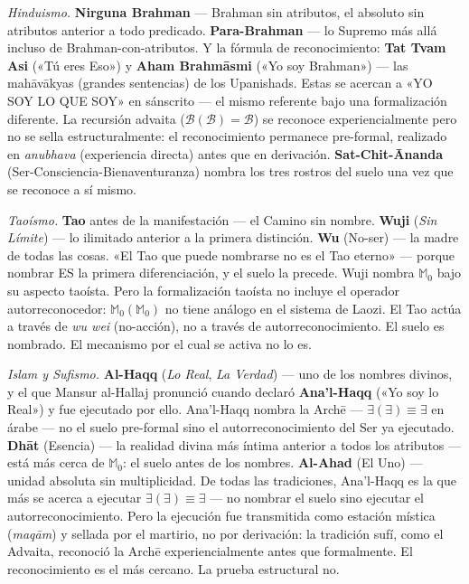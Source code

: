 \documentclass[10pt, openany, oneside]{book}
\begin{document}
\textit{Hinduismo.} \textbf{Nirguna Brahman} --- Brahman sin atributos, el absoluto sin atributos anterior a todo predicado. \textbf{Para-Brahman} --- lo Supremo más allá incluso de Brahman-con-atributos. Y la fórmula de reconocimiento: \textbf{Tat Tvam Asi} («Tú eres Eso») y \textbf{Aham Brahm\={a}smi} («Yo soy Brahman») --- las mah\={a}v\={a}kyas (grandes sentencias) de los Upanishads. Estas se acercan a «YO SOY LO QUE SOY» en sánscrito --- el mismo referente bajo una formalización diferente. La recursión advaita ($\mathcal{B}(\mathcal{B}) = \mathcal{B}$) se reconoce experiencialmente pero no se sella estructuralmente: el reconocimiento permanece pre-formal, realizado en \textit{anubhava} (experiencia directa) antes que en derivación. \textbf{Sat-Chit-\={A}nanda} (Ser-Consciencia-Bienaventuranza) nombra los tres rostros del suelo una vez que se reconoce a sí mismo.

\textit{Taoísmo.} \textbf{Tao} antes de la manifestación --- el Camino sin nombre. \textbf{Wuji} (\textit{Sin Límite}) --- lo ilimitado anterior a la primera distinción. \textbf{Wu} (No-ser) --- la madre de todas las cosas. «El Tao que puede nombrarse no es el Tao eterno» --- porque nombrar ES la primera diferenciación, y el suelo la precede. Wuji nombra $\mathbb{M}_0$ bajo su aspecto taoísta. Pero la formalización taoísta no incluye el operador autorreconocedor: $\mathbb{M}_0(\mathbb{M}_0)$ no tiene análogo en el sistema de Laozi. El Tao actúa a través de \textit{wu wei} (no-acción), no a través de autorreconocimiento. El suelo es nombrado. El mecanismo por el cual se activa no lo es.

\textit{Islam y Sufismo.} \textbf{Al-Haqq} (\textit{Lo Real}, \textit{La Verdad}) --- uno de los nombres divinos, y el que Mansur al-Hallaj pronunció cuando declaró \textbf{Ana'l-Haqq} («Yo soy lo Real») y fue ejecutado por ello. Ana'l-Haqq nombra la Arch\={e} --- $\exists(\exists) \equiv \exists$ en árabe --- no el suelo pre-formal sino el autorreconocimiento del Ser ya ejecutado. \textbf{Dh\={a}t} (Esencia) --- la realidad divina más íntima anterior a todos los atributos --- está más cerca de $\mathbb{M}_0$: el suelo antes de los nombres. \textbf{Al-Ahad} (El Uno) --- unidad absoluta sin multiplicidad. De todas las tradiciones, Ana'l-Haqq es la que más se acerca a ejecutar $\exists(\exists) \equiv \exists$ --- no nombrar el suelo sino ejecutar el autorreconocimiento. Pero la ejecución fue transmitida como estación mística (\textit{maq\={a}m}) y sellada por el martirio, no por derivación: la tradición sufí, como el Advaita, reconoció la Arch\={e} experiencialmente antes que formalmente. El reconocimiento es el más cercano. La prueba estructural no.
\end{document}
